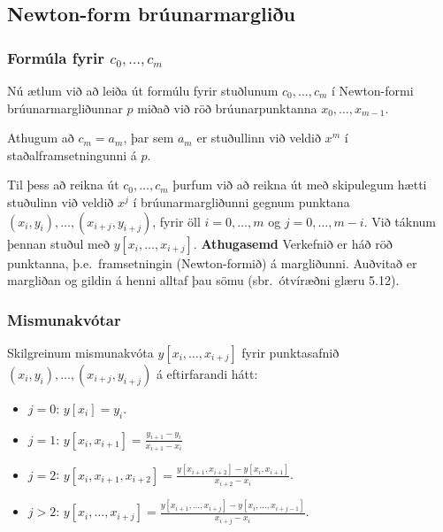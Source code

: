 \documentclass[icelandic,a4paper,12pt]{article}
\begin{document}
\subsection{Newton-form brúunarmargliðu} 
\subsubsection{Formúla fyrir $c_0, \ldots, c_m$}
Nú ætlum við að leiða út formúlu fyrir stuðlunum $c_0, \ldots, c_m$ 
í Newton-formi brúunarmargliðunnar $p$ miðað við röð brúunarpunktanna
$x_0, \ldots, x_{m-1}$. 

\pause
\smallskip
Athugum að $c_m = a_m$, þar sem $a_m$ er
stuðullinn  við veldið $x^m$ í staðalframsetningunni á $p$.


\pause
Til þess að reikna út $c_0, \ldots, c_m$ þurfum við að reikna út 
með skipulegum hætti stuðulinn við veldið $x^j$ í brúunarmargliðunni 
gegnum punktana $(x_i,y_i), \ldots, (x_{i+j},y_{i+j})$, fyrir öll
$i = 0, \ldots, m$ og $j = 0, \ldots, m-i$. Við táknum þennan
stuðul með $y[x_i, \ldots, x_{i+j}]$.
\pause
\textbf{Athugasemd}
 Verkefnið er háð röð punktanna, þ.e.~framsetningin (Newton-formið) á margliðunni. 
 Auðvitað er margliðan og gildin á henni alltaf þau sömu (sbr.~ótvíræðni glæru 5.12).



\subsubsection{Mismunakvótar}
 Skilgreinum mismunakvóta $y[x_i,\ldots,x_{i+j}]$ fyrir punktasafnið
 $(x_i,y_i),\ldots,(x_{i+j},y_{i+j})$ á eftirfarandi hátt:
\begin{itemize}
\item $j=0$:
  $y[x_i] = y_i$.
 
\item $j=1$:
  $y[x_i,x_{i+1}] = \frac{y_{i+1}-y_i}{x_{i+1}-x_i}$

\item $j=2$:
 $y[x_i,x_{i+1},x_{i+2}] = \frac{y[x_{i+1},x_{i+2}] - y[x_i,x_{i+1}]}{x_{i+2}-x_i}$.
 
\item $j>2$:
  $y[x_i,\ldots,x_{i+j}] = \frac{y[x_{i+1},\ldots,x_{i+j}] - y[x_i,\ldots,x_{i+j-1}]}{x_{i+j}-x_i}$.
  
\end{itemize}
\end{document}
